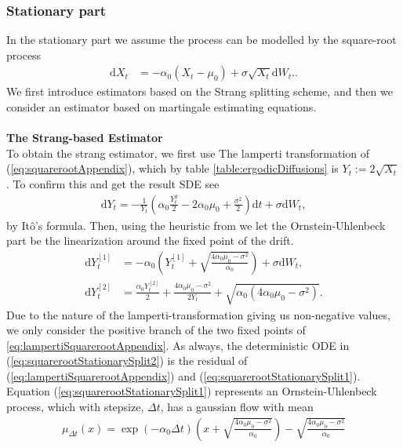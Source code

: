 \subsubsection{Stationary part}\label{subsubsec:squarerootStationary}
In the stationary part we assume the process can be modelled by the square-root process
\begin{align}
    \mathrm{d}X_t &= -\alpha_0\left(X_t - \mu_0\right) + \sigma \sqrt{X_t} \mathrm{d}W_t. \label{eq:squarerootAppendix}.
\end{align}
We first introduce estimators based on the Strang splitting scheme, and then we consider an estimator based on martingale estimating equations.\\\\
\noindent \textbf{The Strang-based Estimator}\\
To obtain the strang estimator, we first use The lamperti transformation of (\ref{eq:squarerootAppendix}), which by table \ref{table:ergodicDiffusions} is $Y_t := 2\sqrt{X_t}$. To confirm this and get the result SDE see
\begin{align}
    \mathrm{d}Y_t = - \frac{1}{Y_t}\left(\alpha_0 \frac{Y_t^2}{2} - 2 \alpha_0 \mu_0 + \frac{\sigma^2}{2}\right)\mathrm{d}t + \sigma \mathrm{d}W_t, \label{eq:lampertiSquarerootAppendix}
\end{align}
by Itô's formula. Then, using the heuristic from \cite[section 2.3 and 2.5]{SplittingSchemes} we let the Ornstein-Uhlenbeck part be the linearization around the fixed point of the drift.
\begin{align}
    \mathrm{d}Y_t^{[1]} &= -\alpha_0 \left(Y_t^{[1]} + \sqrt{\frac{4\alpha_0 \mu_0 - \sigma^2}{\alpha_0}}\right) + \sigma \mathrm{d}W_t , \label{eq:squarerootStationarySplit1} \\
    \mathrm{d}Y_t^{[2]} &= \frac{\alpha_0 Y_t^{[2]}}{2} + \frac{4\alpha_0 \mu_0 - \sigma^2}{2 Y_t} + \sqrt{\alpha_0\left(4\alpha_0\mu_0 - \sigma^2\right)}. \label{eq:squarerootStationarySplit2}
\end{align}
Due to the nature of the lamperti-transformation giving us non-negative values, we only consider the positive branch of the two fixed points of \ref{eq:lampertiSquarerootAppendix}. As always, the deterministic ODE in (\ref{eq:squarerootStationarySplit2}) is the residual of (\ref{eq:lampertiSquarerootAppendix}) and (\ref{eq:squarerootStationarySplit1}).
Equation (\ref{eq:squarerootStationarySplit1}) represents an Ornstein-Uhlenbeck process, which with stepsize, $\Delta t$, has a gaussian flow with mean 
\begin{align}
    \mu_{\Delta t}(x) = \exp\left(-\alpha_0 \Delta t\right) \left(x + \sqrt{\frac{4\alpha_0\mu_0 - \sigma^2}{\alpha_0}}\right) - \sqrt{\frac{4\alpha_0\mu_0 - \sigma^2}{\alpha_0}}
\end{align}
